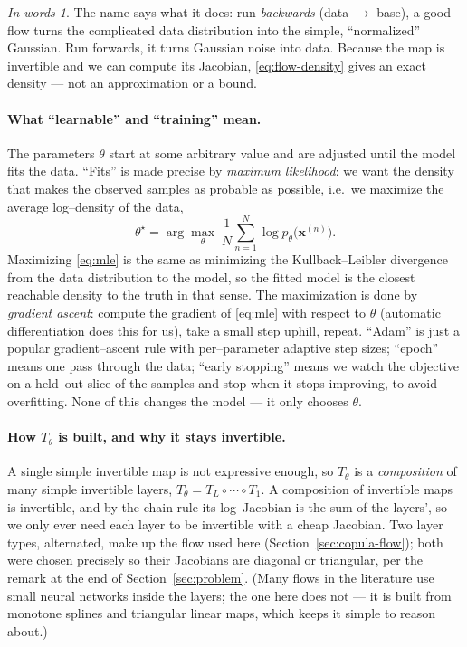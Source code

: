 \documentclass[11pt]{article}
\newcommand{\x}{\bm{x}}
\theoremstyle{remark}
\newtheorem*{plain}{In words}
\begin{document}
\begin{plain}
The name says what it does: run \emph{backwards} (data $\to$ base), a good flow
turns the complicated data distribution into the simple, ``normalized'' Gaussian.
Run forwards, it turns Gaussian noise into data. Because the map is invertible
and we can compute its Jacobian, \eqref{eq:flow-density} gives an exact density
--- not an approximation or a bound.
\end{plain}

\paragraph{What ``learnable'' and ``training'' mean.}
The parameters $\theta$ start at some arbitrary value and are adjusted until the
model fits the data. ``Fits'' is made precise by \emph{maximum likelihood}: we
want the density that makes the observed samples as probable as possible, i.e.\
we maximize the average log--density of the data,
\begin{equation}
\label{eq:mle}
\theta^\star = \arg\max_\theta\ \frac1N\sum_{n=1}^N \log p_\theta\bigl(\x^{(n)}\bigr).
\end{equation}
Maximizing \eqref{eq:mle} is the same as minimizing the Kullback--Leibler
divergence from the data distribution to the model, so the fitted model is the
closest reachable density to the truth in that sense. The maximization is done by
\emph{gradient ascent}: compute the gradient of \eqref{eq:mle} with respect to
$\theta$ (automatic differentiation does this for us), take a small step uphill,
repeat. ``Adam'' is just a popular gradient--ascent rule with per--parameter
adaptive step sizes; ``epoch'' means one pass through the data; ``early
stopping'' means we watch the objective on a held--out slice of the samples and
stop when it stops improving, to avoid overfitting. None of this changes the
model --- it only chooses $\theta$.

\paragraph{How $T_\theta$ is built, and why it stays invertible.}
A single simple invertible map is not expressive enough, so $T_\theta$ is a
\emph{composition} of many simple invertible layers,
$T_\theta=T_L\circ\cdots\circ T_1$. A composition of invertible maps is
invertible, and by the chain rule its log--Jacobian is the sum of the layers',
so we only ever need each layer to be invertible with a cheap Jacobian. Two layer
types, alternated, make up the flow used here (Section~\ref{sec:copula-flow});
both were chosen precisely so their Jacobians are diagonal or triangular, per the
remark at the end of Section~\ref{sec:problem}. (Many flows in the literature use
small neural networks inside the layers; the one here does not --- it is built
from monotone splines and triangular linear maps, which keeps it simple to
reason about.)
\end{document}
